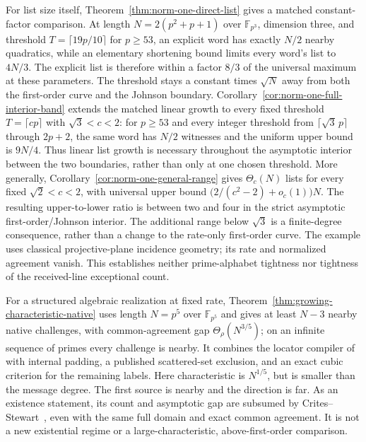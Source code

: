 \documentclass[11pt,letterpaper]{article}
\theoremstyle{definition}
\theoremstyle{remark}
\newcommand{\F}{\mathbb F}
\begin{document}
For list size itself, Theorem~\ref{thm:norm-one-direct-list} gives a
matched constant-factor comparison. At length $N=2(p^2+p+1)$ over
$\F_{p^3}$, dimension three, and threshold
$T=\lceil19p/10\rceil$ for $p\ge53$, an explicit word has exactly $N/2$
nearby quadratics, while an elementary shortening bound limits every
word's list to $4N/3$. The explicit list is therefore within a factor
$8/3$ of the universal maximum at these parameters. The threshold stays
a constant times $\sqrt N$ away from both the first-order curve and
the Johnson boundary. Corollary~\ref{cor:norm-one-full-interior-band} extends the matched
linear growth to every fixed threshold $T=\lceil cp\rceil$ with
$\sqrt3<c<2$: for $p\ge53$ and every integer threshold from
$\lceil\sqrt3\,p\rceil$ through $2p+2$, the same word has $N/2$
witnesses and the uniform upper bound is $9N/4$. Thus linear list growth is
necessary throughout the asymptotic interior between the two boundaries,
rather than only at one chosen threshold. More generally,
Corollary~\ref{cor:norm-one-general-range} gives $\Theta_c(N)$ lists
for every fixed $\sqrt2<c<2$, with universal upper bound
$\bigl(2/(c^2-2)+o_c(1)\bigr)N$. The resulting upper-to-lower ratio
is between two and four in the strict asymptotic first-order/Johnson
interior. The additional range below $\sqrt3$
is a finite-degree consequence, rather than a change to the rate-only
first-order curve. The example uses
classical projective-plane incidence geometry; its rate and normalized
agreement vanish. This establishes neither prime-alphabet tightness nor
tightness of the received-line exceptional count.

For a structured algebraic realization at fixed rate,
Theorem~\ref{thm:growing-characteristic-native} uses length $N=p^5$
over $\mathbb F_{p^5}$ and gives at least $N-3$ nearby native challenges,
with common-agreement gap $\Theta_\rho(N^{3/5})$; on an infinite
sequence of primes every challenge is nearby. It combines the locator
compiler of~\cite{binary-counterexamples} with internal padding,
a published scattered-set exclusion, and an exact cubic criterion for
the remaining labels. Here characteristic is $N^{1/5}$, but is smaller
than the message degree. The first source is nearby and the direction
is far. As an existence statement, its count and asymptotic gap are
subsumed by Crites--Stewart~\cite[Corollary~1]{crites-stewart2025},
even with the same full domain and exact common agreement.
It is not a new existential regime or a large-characteristic,
above-first-order comparison.
\end{document}
